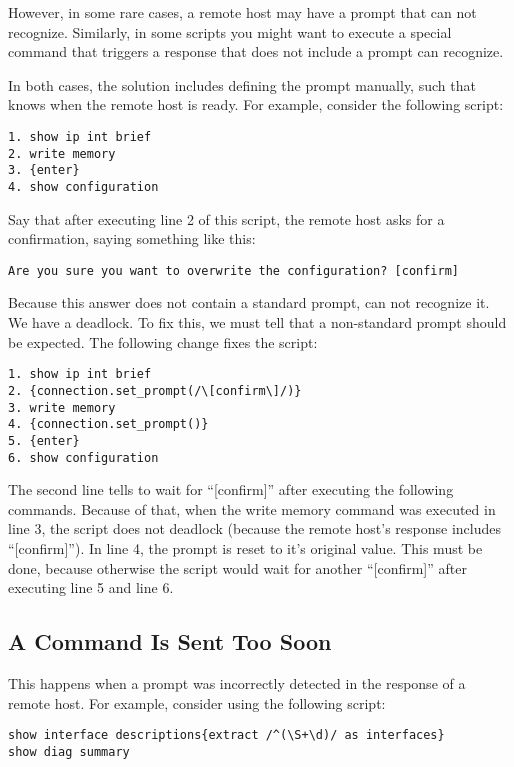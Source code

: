 However, in some rare cases, a remote host may have a prompt that \product 
can not recognize. Similarly, in some scripts you might want to execute a 
special command that triggers a response that does not include a prompt 
\product can recognize.

In both cases, the solution includes defining the prompt manually, such 
that \product knows when the remote host is ready. For example, consider 
the following script: 

\begin{lstlisting}
1. show ip int brief
2. write memory
3. {enter}
4. show configuration
\end{lstlisting}

Say that after executing line 2 of this script, the remote host asks for a 
confirmation, saying something like this: 

\begin{lstlisting}
Are you sure you want to overwrite the configuration? [confirm]
\end{lstlisting}

Because this answer does not contain a standard prompt, \product can not 
recognize it. We have a deadlock. To fix this, we must tell \product that 
a non-standard prompt should be expected. The following change fixes the 
script: 

\begin{lstlisting}
1. show ip int brief
2. {connection.set_prompt(/\[confirm\]/)}
3. write memory
4. {connection.set_prompt()}
5. {enter}
6. show configuration
\end{lstlisting}

The second line tells \product to wait for ``[confirm]'' after executing 
the following commands. Because of that, when the write memory command was 
executed in line 3, the script does not deadlock (because the remote host's 
response includes ``[confirm]''). In line 4, the prompt is reset to it's 
original value. This must be done, because otherwise the script would wait 
for another ``[confirm]'' after executing line 5 and line 6. 


\subsection{A Command Is Sent Too Soon}

This happens when a prompt was incorrectly detected in the response of a 
remote host. For example, consider using the following script:

\begin{lstlisting}
show interface descriptions{extract /^(\S+\d)/ as interfaces}
show diag summary
\end{lstlisting}

